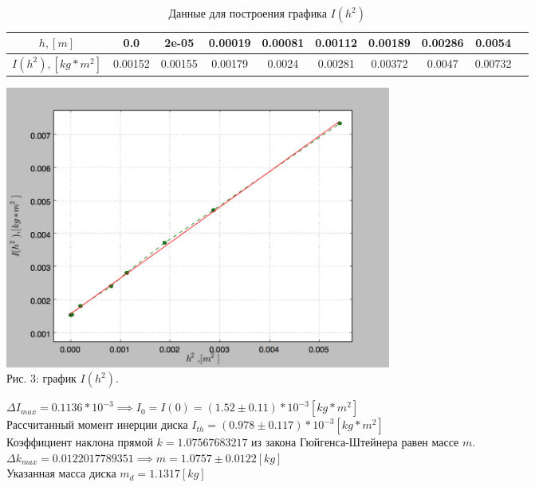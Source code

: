 \documentclass[12pt]{article}
\begin{document}
\begin{enumerate}
\begin{enumerate}
                    \begin{table}[h]
                        \caption{Данные для построения графика $I(h^2)$}
                        \begin{center}
                        \begin{tabular}{|c|c|c|c|c|c|c|c|c|c|}
                            \hline 
                                $h , [m]$ & 0.0 & 2e-05 & 0.00019 & 0.00081 & 0.00112 & 0.00189 & 0.00286 & 0.0054 \\
                            \hline
                                $I(h^2) , [kg * m^2]$ & 0.00152 & 0.00155 & 0.00179 & 0.0024 & 0.00281 & 0.00372 & 0.0047 & 0.00732 \\
                            \hline
                            \end{tabular}
                        \end{center}
                    \end{table}
            \end{enumerate}
            \begin{center} 
                \includegraphics[width=5in]{plot.png} \\ Рис. 3: график $I(h^2)$.
            \end{center}
                $\Delta I_{max} = 0.1136 * 10^{-3} \implies I_0 = I(0) = (1.52 \pm 0.11) * 10 ^ {-3} [kg * m^2]$ \\
                Рассчитанный момент инерции диска $ I_{th} = (0.978 \pm 0.117) * 10^{-3} [kg * m^2] $ \\ 

                Коэффициент наклона прямой $k = 1.07567683217$ из закона Гюйгенса-Штейнера равен массе $m$. \\  
                $\Delta k_{max} = 0.0122017789351 \implies m = 1.0757  \pm 0.0122 [kg]$ \\
                Указанная масса диска $m_{d} = 1.1317 [kg]$



    \end{enumerate}     
\end{document}
